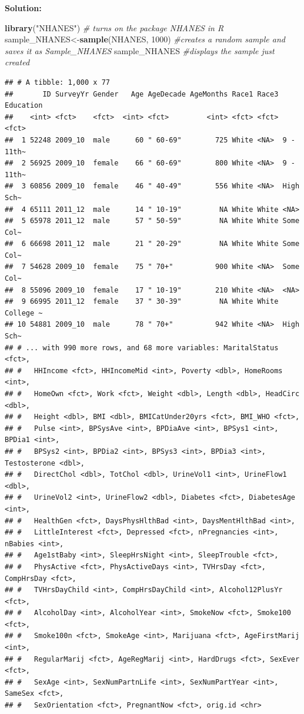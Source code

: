 \documentclass[
]{book}
\newenvironment{Shaded}{\begin{snugshade}}{\end{snugshade}}
\newcommand{\CommentTok}[1]{\textcolor[rgb]{0.56,0.35,0.01}{\textit{#1}}}
\newcommand{\DecValTok}[1]{\textcolor[rgb]{0.00,0.00,0.81}{#1}}
\newcommand{\KeywordTok}[1]{\textcolor[rgb]{0.13,0.29,0.53}{\textbf{#1}}}
\newcommand{\NormalTok}[1]{#1}
\newcommand{\StringTok}[1]{\textcolor[rgb]{0.31,0.60,0.02}{#1}}
\begin{document}
\textbf{Solution:}

\begin{Shaded}
\begin{Highlighting}[]
\KeywordTok{library}\NormalTok{(}\StringTok{"NHANES"}\NormalTok{) }\CommentTok{# turns on the package NHANES in R}
\NormalTok{sample_NHANES<-}\KeywordTok{sample}\NormalTok{(NHANES, }\DecValTok{1000}\NormalTok{) }\CommentTok{#creates a random sample and saves it as Sample_NHANES}
\NormalTok{sample_NHANES }\CommentTok{#displays the sample just created}
\end{Highlighting}
\end{Shaded}

\begin{verbatim}
## # A tibble: 1,000 x 77
##       ID SurveyYr Gender   Age AgeDecade AgeMonths Race1 Race3 Education
##    <int> <fct>    <fct>  <int> <fct>         <int> <fct> <fct> <fct>    
##  1 52248 2009_10  male      60 " 60-69"        725 White <NA>  9 - 11th~
##  2 56925 2009_10  female    66 " 60-69"        800 White <NA>  9 - 11th~
##  3 60856 2009_10  female    46 " 40-49"        556 White <NA>  High Sch~
##  4 65111 2011_12  male      14 " 10-19"         NA White White <NA>     
##  5 65978 2011_12  male      57 " 50-59"         NA White White Some Col~
##  6 66698 2011_12  male      21 " 20-29"         NA White White Some Col~
##  7 54628 2009_10  female    75 " 70+"          900 White <NA>  Some Col~
##  8 55096 2009_10  female    17 " 10-19"        210 White <NA>  <NA>     
##  9 66995 2011_12  female    37 " 30-39"         NA White White College ~
## 10 54881 2009_10  male      78 " 70+"          942 White <NA>  High Sch~
## # ... with 990 more rows, and 68 more variables: MaritalStatus <fct>,
## #   HHIncome <fct>, HHIncomeMid <int>, Poverty <dbl>, HomeRooms <int>,
## #   HomeOwn <fct>, Work <fct>, Weight <dbl>, Length <dbl>, HeadCirc <dbl>,
## #   Height <dbl>, BMI <dbl>, BMICatUnder20yrs <fct>, BMI_WHO <fct>,
## #   Pulse <int>, BPSysAve <int>, BPDiaAve <int>, BPSys1 <int>, BPDia1 <int>,
## #   BPSys2 <int>, BPDia2 <int>, BPSys3 <int>, BPDia3 <int>, Testosterone <dbl>,
## #   DirectChol <dbl>, TotChol <dbl>, UrineVol1 <int>, UrineFlow1 <dbl>,
## #   UrineVol2 <int>, UrineFlow2 <dbl>, Diabetes <fct>, DiabetesAge <int>,
## #   HealthGen <fct>, DaysPhysHlthBad <int>, DaysMentHlthBad <int>,
## #   LittleInterest <fct>, Depressed <fct>, nPregnancies <int>, nBabies <int>,
## #   Age1stBaby <int>, SleepHrsNight <int>, SleepTrouble <fct>,
## #   PhysActive <fct>, PhysActiveDays <int>, TVHrsDay <fct>, CompHrsDay <fct>,
## #   TVHrsDayChild <int>, CompHrsDayChild <int>, Alcohol12PlusYr <fct>,
## #   AlcoholDay <int>, AlcoholYear <int>, SmokeNow <fct>, Smoke100 <fct>,
## #   Smoke100n <fct>, SmokeAge <int>, Marijuana <fct>, AgeFirstMarij <int>,
## #   RegularMarij <fct>, AgeRegMarij <int>, HardDrugs <fct>, SexEver <fct>,
## #   SexAge <int>, SexNumPartnLife <int>, SexNumPartYear <int>, SameSex <fct>,
## #   SexOrientation <fct>, PregnantNow <fct>, orig.id <chr>
\end{verbatim}
\end{document}
